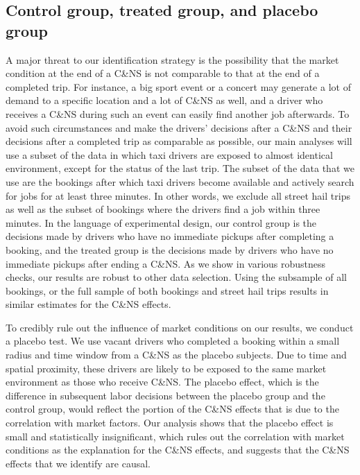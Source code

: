 \documentclass[reviewmode,AEJ]{AEA}
\begin{document}
\subsection{Control group, treated group, and placebo group}
A major threat to our identification strategy is the possibility that the market condition at the end of a C\&NS is not comparable to that at the end of a completed trip. For instance, a big sport event or a concert may generate a lot of demand to a specific location and a lot of C\&NS as well, and a driver who receives a C\&NS during such an event can easily find another job afterwards.
To avoid such circumstances and make the drivers' decisions after a C\&NS and their decisions after a completed trip as comparable as possible, our main analyses will use a subset of the data in which taxi drivers are exposed to almost identical environment, except for the status of the last trip. The subset of the data that we use are the bookings after which taxi drivers become available and actively search for jobs for at least three minutes. In other words, we exclude all street hail trips as well as the subset of bookings where the drivers find a job within three minutes. In the language of experimental design, our control group is the decisions made by drivers who have no immediate pickups after completing a booking, and the treated group is the decisions made by drivers who have no immediate pickups after ending a C\&NS. As we show in various robustness checks, our results are robust to other data selection. Using the subsample of all bookings, or the full sample of both bookings and street hail trips results in similar estimates for the C\&NS effects.

To credibly rule out the influence of market conditions on our results, we conduct a placebo test. We use vacant drivers who completed a booking within a small radius and time window from a C\&NS as the placebo subjects. Due to time and spatial proximity, these drivers are likely to be exposed to the same market environment as those who receive C\&NS. The placebo effect, which is the difference in subsequent labor decisions between the placebo group and the control group, would reflect the portion of the C\&NS effects that is  due to the correlation with market factors. Our analysis shows that the placebo effect is small and statistically insignificant, which rules out the correlation with market conditions as the explanation for the C\&NS effects, and suggests that the C\&NS effects that we identify are causal.
\end{document}
